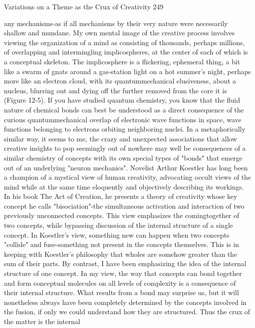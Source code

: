 Variations on a Theme as the Crux of Creativity                                        249

any mechanisms-as if all mechanisms by their very nature were necessarily shallow
and mundane.
        My own mental image of the creative process involves viewing the
organization of a mind as consisting of thousands, perhaps millions, of overlapping
and intermingling implicospheres, at the center of each of which is a conceptual
skeleton. The implicosphere is a flickering, ephemeral thing, a bit like a swarm of
gnats around a gas-station light on a hot summer's night, perhaps more like an
electron cloud, with its quantummechanical elusiveness, about a nucleus, blurring out
and dying off the further removed from the core it is (Figure 12-5). If you have
studied quantum chemistry, you know that the fluid nature of chemical bonds can best
be understood as a direct consequence of the curious quantummechanical overlap of
electronic wave functions in space, wave functions belonging to electrons orbiting
neighboring nuclei. In a metaphorically similar way, it seems to me, the crazy and
unexpected associations that allow creative insights to pop seemingly out of nowhere
may well be consequences of a similar chemistry of concepts with its own special
types of "bonds" that emerge out of an underlying "neuron mechanics".
        Novelist Arthur Koestler has long been a champion of a mystical view of
human creativity, advocating occult views of the mind while at the same time
eloquently and objectively describing its workings. In his book The Act of Creation,
he presents a theory of creativity whose key concept he calls "bisociation"-the
simultaneous activation and interaction of two previously unconnected concepts. This
view emphasizes the comingtogether of two concepts, while bypassing discussion of
the internal structure of a single concept. In Koestler's view, something new can
happen when two concepts "collide" and fuse-something not present in the concepts
themselves. This is in keeping with Koestler's philosophy that wholes are somehow
greater than the sum of their parts.
        By contrast, I have been emphasizing the idea of the internal structure of one
concept. In my view, the way that concepts can bond together and form conceptual
molecules on all levels of complexity is a consequence of their internal structure.
What results from a bond may surprise us, but it will nonetheless always have been
completely determined by the concepts involved in the fusion, if only we could
understand how they are structured. Thus the crux of the matter is the internal
